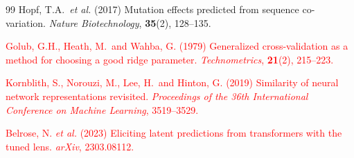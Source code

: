 \documentclass[numbered,webpdf,modern,large]{oup-authoring-template}
\newcommand{\rev}[1]{\textcolor{red}{#1}}
\begin{document}
\begin{thebibliography}{99}
Hopf, T.A.\ \textit{et al.} (2017)
Mutation effects predicted from sequence co-variation.
\textit{Nature Biotechnology}, \textbf{35}(2), 128--135.

\rev{Golub, G.H., Heath, M.\ and Wahba, G. (1979)
Generalized cross-validation as a method for choosing a good ridge parameter.
\textit{Technometrics}, \textbf{21}(2), 215--223.}

\rev{Kornblith, S., Norouzi, M., Lee, H.\ and Hinton, G. (2019)
Similarity of neural network representations revisited.
\textit{Proceedings of the 36th International Conference on Machine Learning},
3519--3529.}

\rev{Belrose, N. \textit{et al.} (2023)
Eliciting latent predictions from transformers with the tuned lens.
\textit{arXiv}, 2303.08112.}

\end{thebibliography}
\end{document}
